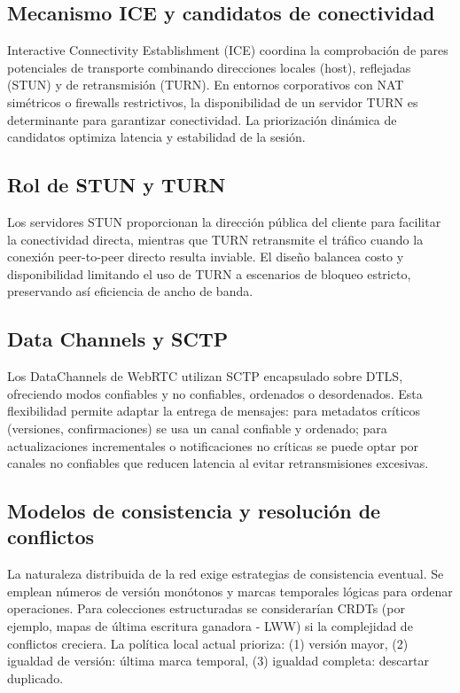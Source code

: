 \documentclass[12pt,a4paper]{report}
\begin{document}
\subsection*{Mecanismo ICE y candidatos de conectividad}
Interactive Connectivity Establishment (ICE) coordina la comprobación de pares potenciales de transporte combinando direcciones locales (host), reflejadas (STUN) y de retransmisión (TURN). En entornos corporativos con NAT simétricos o firewalls restrictivos, la disponibilidad de un servidor TURN es determinante para garantizar conectividad. La priorización dinámica de candidatos optimiza latencia y estabilidad de la sesión.

\subsection*{Rol de STUN y TURN}
Los servidores STUN proporcionan la dirección pública del cliente para facilitar la conectividad directa, mientras que TURN retransmite el tráfico cuando la conexión peer-to-peer directo resulta inviable. El diseño balancea costo y disponibilidad limitando el uso de TURN a escenarios de bloqueo estricto, preservando así eficiencia de ancho de banda.

\subsection*{Data Channels y SCTP}
Los DataChannels de WebRTC utilizan SCTP encapsulado sobre DTLS, ofreciendo modos confiables y no confiables, ordenados o desordenados. Esta flexibilidad permite adaptar la entrega de mensajes: para metadatos críticos (versiones, confirmaciones) se usa un canal confiable y ordenado; para actualizaciones incrementales o notificaciones no críticas se puede optar por canales no confiables que reducen latencia al evitar retransmisiones excesivas.

\subsection*{Modelos de consistencia y resolución de conflictos}
La naturaleza distribuida de la red exige estrategias de consistencia eventual. Se emplean números de versión monótonos y marcas temporales lógicas para ordenar operaciones. Para colecciones estructuradas se considerarían CRDTs (por ejemplo, mapas de última escritura ganadora - LWW) si la complejidad de conflictos creciera. La política local actual prioriza: (1) versión mayor, (2) igualdad de versión: última marca temporal, (3) igualdad completa: descartar duplicado.
\end{document}

